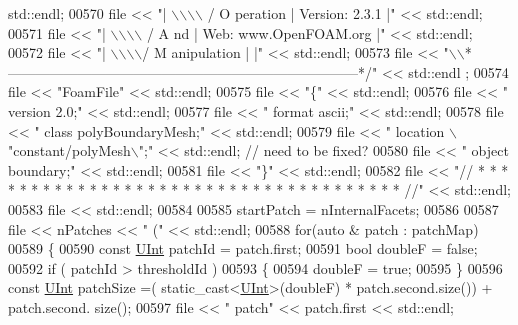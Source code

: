 \begin{DoxyCode}
      std::endl;
00570     file << \textcolor{stringliteral}{"|  \(\backslash\)\(\backslash\)\(\backslash\)\(\backslash\)    /   O peration     | Version:  2.3.1                                 |"} << 
      std::endl;
00571     file << \textcolor{stringliteral}{"|   \(\backslash\)\(\backslash\)\(\backslash\)\(\backslash\)  /    A nd           | Web:      www.OpenFOAM.org                      |"} << 
      std::endl;
00572     file << \textcolor{stringliteral}{"|    \(\backslash\)\(\backslash\)\(\backslash\)\(\backslash\)/     M anipulation  |                                                 |"} << 
      std::endl;
00573     file << \textcolor{stringliteral}{"\(\backslash\)\(\backslash\)*---------------------------------------------------------------------------*/"} << std::endl
      ;
00574     file << \textcolor{stringliteral}{"FoamFile"} << std::endl;
00575     file << \textcolor{stringliteral}{"\{"} << std::endl;
00576     file << \textcolor{stringliteral}{"    version     2.0;"} << std::endl;
00577     file << \textcolor{stringliteral}{"    format      ascii;"} << std::endl;
00578     file << \textcolor{stringliteral}{"    class       polyBoundaryMesh;"} << std::endl;
00579     file << \textcolor{stringliteral}{"    location    \(\backslash\)"constant/polyMesh\(\backslash\)";"} << std::endl; \textcolor{comment}{// need to be fixed?}
00580     file << \textcolor{stringliteral}{"    object      boundary;"} << std::endl;
00581     file << \textcolor{stringliteral}{"\}"} << std::endl;
00582     file << \textcolor{stringliteral}{"// * * * * * * * * * * * * * * * * * * * * * * * * * * * * * * * * * * * * * //"} << std::endl;
00583     file << std::endl;
00584 
00585     startPatch = nInternalFacets;
00586 
00587     file << nPatches << \textcolor{stringliteral}{" ("} << std::endl;
00588     \textcolor{keywordflow}{for}(\textcolor{keyword}{auto} & patch : patchMap)
00589     \{
00590         \textcolor{keyword}{const} \hyperlink{namespaceFVCode3D_a4bf7e328c75d0fd504050d040ebe9eda}{UInt} patchId = patch.first;
00591         \textcolor{keywordtype}{bool} doubleF = \textcolor{keyword}{false};
00592         \textcolor{keywordflow}{if} ( patchId > thresholdId )
00593         \{
00594             doubleF = \textcolor{keyword}{true};
00595         \}
00596         \textcolor{keyword}{const} \hyperlink{namespaceFVCode3D_a4bf7e328c75d0fd504050d040ebe9eda}{UInt} patchSize =( \textcolor{keyword}{static\_cast<}\hyperlink{namespaceFVCode3D_a4bf7e328c75d0fd504050d040ebe9eda}{UInt}\textcolor{keyword}{>}(doubleF) * patch.second.size()) +  patch.second.
      size();
00597         file << \textcolor{stringliteral}{"    patch"} << patch.first << std::endl;

\end{DoxyCode}
